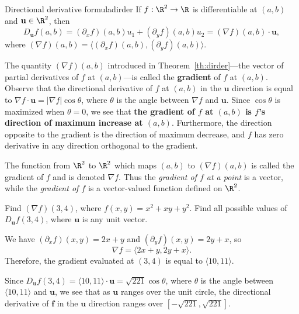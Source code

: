 \documentclass[indent]{watsonbook}
\begin{document}
{\begin{theo}{Directional derivative formula}{dirder}
  If $f:\R^2 \to \R$ is differentiable at $(a,b)$ and
  $ \mathbf{u} \in \R^2$, then
  \[
    D_{\mathbf{u}} f(a,b) = (\partial_xf)(a,b)u_1 +
    (\partial_yf)(a,b)u_2 =  (\nabla f)(a,b) \cdot \mathbf{u},
  \]
  where $(\nabla f)(a,b)= \langle (\partial_x f)(a,b), (\partial_y f)(a,b) \rangle$.
\end{theo}


The quantity $(\nabla f)(a,b)$ introduced in
Theorem~\ref{th:dirder}---the vector of partial derivatives of $f$
at $(a,b)$---is called the \textbf{gradient} of $f$ at
$(a,b)$. Observe that the directional derivative of $f$ at $(a,b)$
in the $\mathbf{u}$ direction is equal to
$\nabla f \cdot \mathbf{u} = |\nabla f| \cos \theta$, where $\theta$
is the angle between $\nabla f$ and $\mathbf{u}$. Since $\cos\theta$
is maximized when $\theta = 0$, we see that \textbf{the gradient of
  $f$ at $(a,b)$ is $f$'s direction of maximum increase at
  $(a,b)$}. Furthermore, the direction opposite to the gradient is
the direction of maximum decrease, and $f$ has zero derivative in
any direction orthogonal to the gradient. \bang{-10mm}

The function from $\R^2$ to $\R^2$ which maps $(a,b)$ to $(\nabla
f)(a,b)$ is called the gradient of $f$ and is denoted $\nabla
f$. Thus the \textit{gradient  of $f$ at a point} is a vector, while
the \textit{gradient of $f$} is a vector-valued function defined on
$\R^2$.

\begin{example}{}{}
  Find $(\nabla f)(3,4)$, where $f(x,y) = x^2 + xy + y^2$. Find all
  possible values of $D_{\mathbf{u}}f(3,4)$, where $\mathbf{u}$ is
  any unit vector.
\end{example}

\begin{solution}
  We have $(\partial_xf)(x,y)= 2x + y$ and $(\partial_y f)(x,y) = 2y
  + x$, so
  \[
    \nabla f = \langle 2x + y, 2y + x \rangle.
  \]
  Therefore, the gradient evaluated at $(3,4)$ is equal to
  $\boxed{\langle 10,11\rangle}$.

  Since  $D_{\mathbf{u}}f(3,4) = \langle 10,11\rangle \cdot
  \mathbf{u} = \sqrt{221}\cos\theta$, where $\theta$ is the angle
  between $\langle 10,11\rangle$ and $\mathbf{u}$, we see that as
  $\mathbf{u}$ ranges over the unit circle, the directional
  derivative of $\mathbf{f}$ in the $\mathbf{u}$ direction ranges
  over $\boxed{[-\sqrt{221}, \sqrt{221}]}$.
\end{solution}

}
\end{document}
